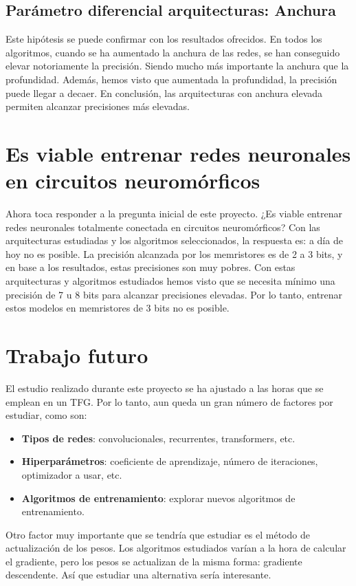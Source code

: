 \subsection{Parámetro diferencial arquitecturas: Anchura}

Este hipótesis se puede confirmar con los resultados ofrecidos. En todos los algoritmos, cuando se ha aumentado la anchura de las redes, se han conseguido elevar notoriamente la precisión. Siendo mucho más importante la anchura que la profundidad. Además, hemos visto que aumentada la profundidad, la precisión puede llegar a decaer. En conclusión, las arquitecturas con anchura elevada permiten alcanzar precisiones más elevadas.

\section{Es viable entrenar redes neuronales en circuitos neuromórficos}

Ahora toca responder a la pregunta inicial de este proyecto. ¿Es viable entrenar redes neuronales totalmente conectada en circuitos neuromórficos? Con las arquitecturas estudiadas y los algoritmos seleccionados, la respuesta es: a día de hoy no es posible. La precisión alcanzada por los memristores es de 2 a 3 bits, y en base a los resultados, estas precisiones son muy pobres. Con estas arquitecturas y algoritmos estudiados hemos visto que se necesita mínimo una precisión de 7 u 8 bits para alcanzar precisiones elevadas. Por lo tanto, entrenar estos modelos en memristores de 3 bits no es posible.  

\section{Trabajo futuro}

El estudio realizado durante este proyecto se ha ajustado a las horas que se emplean en un TFG. Por lo tanto, aun queda un gran número de factores por estudiar, como son: 
\begin{itemize}
    \item \textbf{Tipos de redes}: convolucionales, recurrentes, transformers, etc.
    \item \textbf{Hiperparámetros}: coeficiente de aprendizaje, número de iteraciones, optimizador a usar, etc.
    \item \textbf{Algoritmos de entrenamiento}: explorar nuevos algoritmos de entrenamiento. 
\end{itemize}

Otro factor muy importante que se tendría que estudiar es el método de actualización de los pesos. Los algoritmos estudiados varían a la hora de calcular el gradiente, pero los pesos se actualizan de la misma forma: gradiente descendente. Así que estudiar una alternativa sería interesante. 